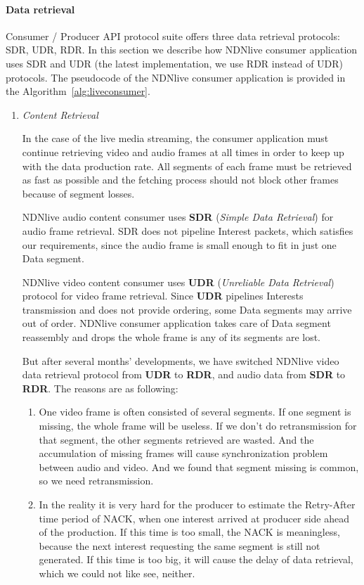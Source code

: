 \paragraph{Data retrieval}
\label{par:NDNlive_dataretrievalprotocol}
\vspace{0.3cm}
Consumer / Producer API protocol suite offers three data retrieval protocols: SDR, UDR, RDR. In this section we describe how NDNlive consumer application uses SDR and UDR (the latest implementation, we use RDR instead of UDR) protocols. The pseudocode of the NDNlive consumer application is provided in the Algorithm~\ref{alg:liveconsumer}. 

\begin{enumerate}
	\item {\textit{Content Retrieval}}
	
In the case of the live media streaming, the consumer application must continue retrieving video and audio frames at all times in order to keep up with the data production rate. All segments of each frame must be retrieved as fast as possible and the fetching process should not block other frames because of segment losses. 

NDNlive audio content consumer uses \textbf{SDR} (\textit{Simple Data Retrieval}) for audio frame retrieval. SDR does not pipeline Interest packets, which satisfies our requirements, since the audio frame is small enough to fit in just one Data segment.	

NDNlive video content consumer uses \textbf{UDR} (\textit{Unreliable Data Retrieval}) protocol for video frame retrieval. Since \textbf{UDR} pipelines Interests transmission and does not provide ordering, some Data segments may arrive out of order. NDNlive consumer application takes care of Data segment reassembly and drops the whole frame is any of its segments are lost. 

But after several months' developments, we have switched NDNlive video data retrieval protocol from \textbf{UDR} to \textbf{RDR}, and audio data from \textbf{SDR} to \textbf{RDR}. The reasons are as following:
	\begin{enumerate}
		\item One video frame is often consisted of several segments. If one segment is missing, the whole frame will be useless. If we don't do retransmission for that segment, the other segments retrieved are wasted. And the accumulation of missing frames will cause synchronization problem between audio and video. And we found that segment missing is common, so we need retransmission.
		\item In the reality it is very hard for the producer to estimate the Retry-After time period of NACK, when one interest arrived at producer side ahead of the production. If this time is too small, the NACK is meaningless, because the next interest requesting the same segment is still not generated. If this time is too big, it will cause the delay of data retrieval, which we could not like see, neither. 


\end{enumerate}
\end{enumerate}
